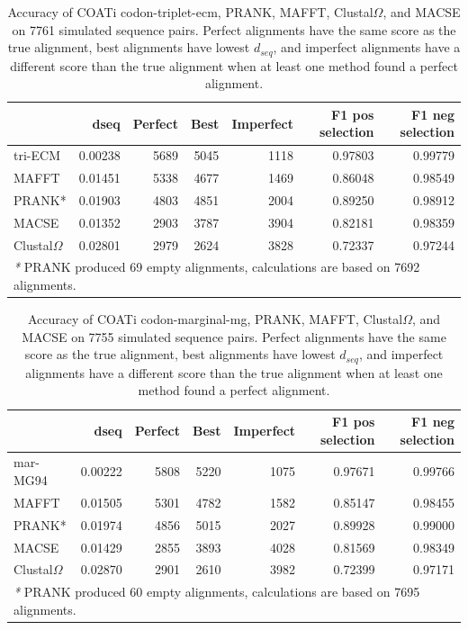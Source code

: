 \begin{table}[H]

\centering
\begin{tabular}[t]{l|r|r|r|r|r|r}
\hline
  & dseq & Perfect & Best & Imperfect & F1 pos selection & F1 neg selection\\
\hline
tri-ECM & 0.00238 & 5689 & 5045 & 1118 & 0.97803 & 0.99779\\
\hline
MAFFT & 0.01451 & 5338 & 4677 & 1469 & 0.86048 & 0.98549\\
\hline
PRANK* & 0.01903 & 4803 & 4851 & 2004 & 0.89250 & 0.98912\\
\hline
MACSE & 0.01352 & 2903 & 3787 & 3904 & 0.82181 & 0.98359\\
\hline
Clustal$\Omega$ & 0.02801 & 2979 & 2624 & 3828 & 0.72337 & 0.97244\\
\hline
\multicolumn{7}{l}{\rule{0pt}{1em}\textit{*} PRANK produced 69 empty alignments, calculations are based on 7692 alignments.}\\
\end{tabular}
\caption[COATi Triplet-ECM Benchmark Results]{Accuracy of COATi codon-triplet-ecm, PRANK, MAFFT, Clustal$\Omega$, and MACSE on 7761 simulated sequence pairs. Perfect alignments have the same score as the true alignment, best alignments have lowest $d_{seq}$, and imperfect alignments have a different score than the true alignment when at least one method found a perfect alignment.}
\label{table:results-tri-ecm}
\end{table}

\begin{table}[H]
\centering
\begin{tabular}[t]{l|r|r|r|r|r|r}
\hline
  & dseq & Perfect & Best & Imperfect & F1 pos selection & F1 neg selection\\
\hline
mar-MG94 & 0.00222 & 5808 & 5220 & 1075 & 0.97671 & 0.99766\\
\hline
MAFFT & 0.01505 & 5301 & 4782 & 1582 & 0.85147 & 0.98455\\
\hline
PRANK* & 0.01974 & 4856 & 5015 & 2027 & 0.89928 & 0.99000\\
\hline
MACSE & 0.01429 & 2855 & 3893 & 4028 & 0.81569 & 0.98349\\
\hline
Clustal$\Omega$ & 0.02870 & 2901 & 2610 & 3982 & 0.72399 & 0.97171\\
\hline
\multicolumn{7}{l}{\rule{0pt}{1em}\textit{*} PRANK produced 60 empty alignments, calculations are based on 7695 alignments.}\\
\end{tabular}
\caption[COATi Marginal-MG94 Benchmark Results]{Accuracy of COATi codon-marginal-mg, PRANK, MAFFT, Clustal$\Omega$, and MACSE on 7755 simulated sequence pairs. Perfect alignments have the same score as the true alignment, best alignments have lowest $d_{seq}$, and imperfect alignments have a different score than the true alignment when at least one method found a perfect alignment.}
\label{table:results-mar-mg}
\end{table}

